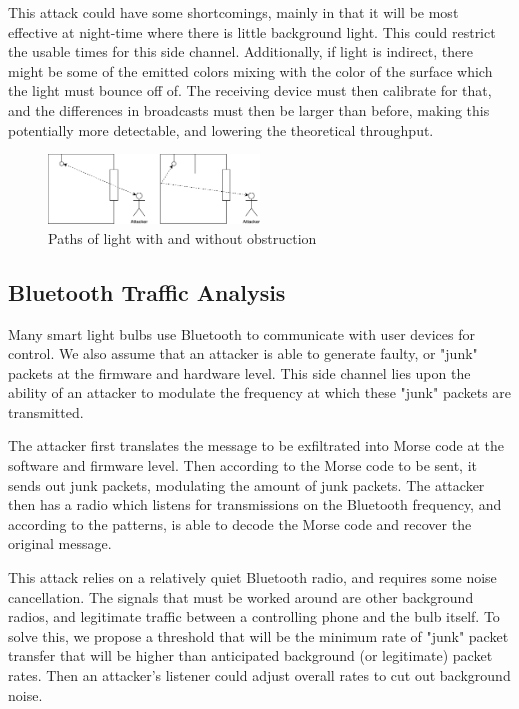 \documentclass[conference]{IEEEtran}
\begin{document}
This attack could have some shortcomings, mainly in that it will be most effective at night-time where there is little background light. This could restrict the usable times for this side channel. Additionally, if light is indirect, there might be some of the emitted colors mixing with the color of the surface which the light must bounce off of. The receiving device must then calibrate for that, and the differences in broadcasts must then be larger than before, making this potentially more detectable, and lowering the theoretical throughput.

\begin{figure}
  \centering
  \includegraphics[width=0.5\textwidth]{attacker_lightpaths.png}
  \caption{Paths of light with and without obstruction}
\end{figure}

\subsection{Bluetooth Traffic Analysis}

Many smart light bulbs use Bluetooth to communicate with user devices for control\cite{bt_speaker1}\cite{bt_speaker2}\cite{bt_light1}. We also assume that an attacker is able to generate faulty, or "junk" packets at the firmware and hardware level. This side channel lies upon the ability of an attacker to modulate the frequency at which these "junk" packets are transmitted.

The attacker first translates the message to be exfiltrated into Morse code at the software and firmware level. Then according to the Morse code to be sent, it sends out junk packets, modulating the amount of junk packets. The attacker then has a radio which listens for transmissions on the Bluetooth frequency, and according to the patterns, is able to decode the Morse code and recover the original message.

This attack relies on a relatively quiet Bluetooth radio, and requires some noise cancellation. The signals that must be worked around are other background radios, and legitimate traffic between a controlling phone and the bulb itself. To solve this, we propose a threshold that will be the minimum rate of "junk" packet transfer that will be higher than anticipated background (or legitimate) packet rates. Then an attacker's listener could adjust overall rates to cut out background noise.
\end{document}
